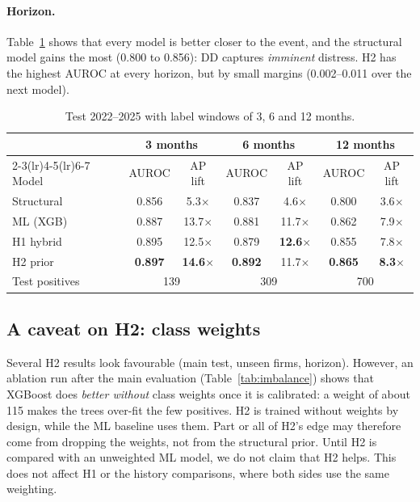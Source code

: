 \paragraph{Horizon.} Table~\ref{tab:horizon} shows that every model is better closer to the event, and the
structural model gains the most (0.800 to 0.856): DD captures \emph{imminent} distress. H2 has the highest AUROC
at every horizon, but by small margins (0.002--0.011 over the next model).

\begin{table}[htbp]
\centering
\small
\begin{tabular}{lcccccc}
\toprule
 & \multicolumn{2}{c}{3 months} & \multicolumn{2}{c}{6 months} & \multicolumn{2}{c}{12 months} \\
\cmidrule(lr){2-3}\cmidrule(lr){4-5}\cmidrule(lr){6-7}
Model & AUROC & AP lift & AUROC & AP lift & AUROC & AP lift \\
\midrule
Structural & 0.856 & 5.3$\times$ & 0.837 & 4.6$\times$ & 0.800 & 3.6$\times$ \\
ML (XGB) & 0.887 & 13.7$\times$ & 0.881 & 11.7$\times$ & 0.862 & 7.9$\times$ \\
H1 hybrid & 0.895 & 12.5$\times$ & 0.879 & \textbf{12.6$\times$} & 0.855 & 7.8$\times$ \\
H2 prior & \textbf{0.897} & \textbf{14.6$\times$} & \textbf{0.892} & 11.7$\times$ & \textbf{0.865} & \textbf{8.3$\times$} \\
\midrule
Test positives & \multicolumn{2}{c}{139} & \multicolumn{2}{c}{309} & \multicolumn{2}{c}{700} \\
\bottomrule
\end{tabular}
\caption{Test 2022--2025 with label windows of 3, 6 and 12 months.}
\label{tab:horizon}
\end{table}

\subsection{A caveat on H2: class weights}
\label{sec:caveat}

Several H2 results look favourable (main test, unseen firms, horizon). However, an ablation run after the main
evaluation (Table~\ref{tab:imbalance}) shows that XGBoost does \emph{better without} class weights once it is
calibrated: a weight of about 115 makes the trees over-fit the few positives. H2 is trained without weights by
design, while the ML baseline uses them. Part or all of H2's edge may therefore come from dropping the weights,
not from the structural prior. Until H2 is compared with an unweighted ML model, we do not claim that H2 helps.
This does not affect H1 or the history comparisons, where both sides use the same weighting.

